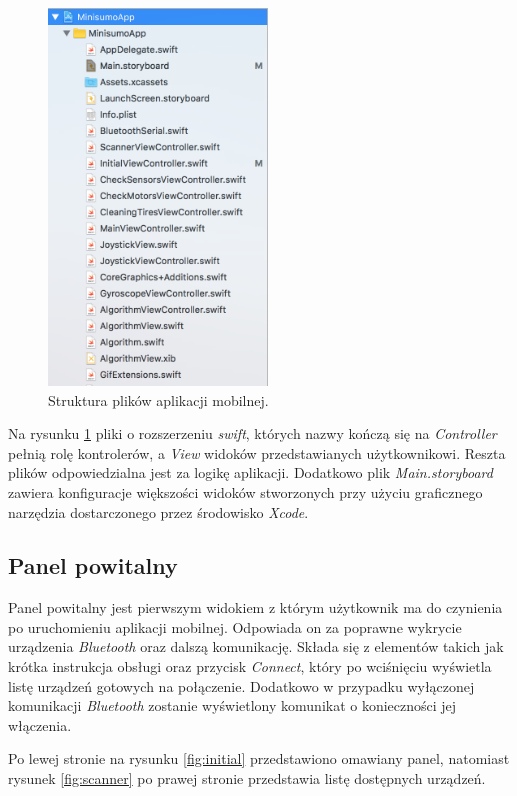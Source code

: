 \begin{figure}[H]
	\centering
		\includegraphics[width=0.75\linewidth, height=10cm, keepaspectratio]{pic05/structure.png}
	\caption{Struktura plików aplikacji mobilnej.}
	\label{fig:structure}	
\end{figure}

Na rysunku \ref{fig:structure} pliki o rozszerzeniu \textit{swift}, których nazwy kończą się na \textit{Controller} pełnią rolę kontrolerów, a \textit{View} widoków przedstawianych użytkownikowi. Reszta plików odpowiedzialna jest za logikę aplikacji. Dodatkowo plik \textit{Main.storyboard} zawiera konfiguracje większości widoków stworzonych przy użyciu graficznego narzędzia dostarczonego przez środowisko \textit{Xcode}.

\subsection{Panel powitalny}
Panel powitalny jest pierwszym widokiem z którym użytkownik ma do czynienia po uruchomieniu aplikacji mobilnej. Odpowiada on za poprawne wykrycie urządzenia \textit{Bluetooth} oraz dalszą komunikację. Składa się z elementów takich jak krótka instrukcja obsługi oraz przycisk \textit{Connect}, który po wciśnięciu wyświetla listę urządzeń gotowych na połączenie. Dodatkowo w przypadku wyłączonej komunikacji \textit{Bluetooth} zostanie wyświetlony komunikat o konieczności jej włączenia. 

\newpage

Po lewej stronie na rysunku \ref{fig:initial} przedstawiono omawiany panel, natomiast rysunek \ref{fig:scanner} po prawej stronie przedstawia listę dostępnych urządzeń.

